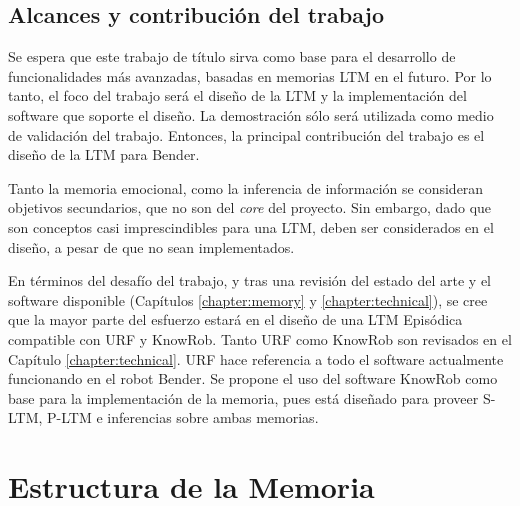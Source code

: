 \subsection{Alcances y contribución del trabajo}
Se espera que este trabajo de título sirva como base para el desarrollo de funcionalidades más avanzadas, basadas en memorias LTM en el futuro. Por lo tanto, el foco del trabajo será el diseño de la LTM y la implementación del software que soporte el diseño. La demostración sólo será utilizada como medio de validación del trabajo. Entonces, la principal contribución del trabajo es el diseño de la LTM para Bender.

Tanto la memoria emocional, como la inferencia de información se consideran objetivos secundarios, que no son del \textit{core} del proyecto. Sin embargo, dado que son conceptos casi imprescindibles para una LTM, deben ser considerados en el diseño, a pesar de que no sean implementados.

En términos del desafío del trabajo, y tras una revisión del estado del arte y el software disponible (Capítulos \ref{chapter:memory} y \ref{chapter:technical}), se cree que la mayor parte del esfuerzo estará en el diseño de una LTM Episódica compatible con URF y KnowRob. Tanto URF como KnowRob  son revisados en el Capítulo \ref{chapter:technical}. URF hace referencia a todo el software actualmente funcionando en el robot Bender. Se propone el uso del software KnowRob como base para la implementación de la memoria, pues está diseñado para proveer S-LTM, P-LTM e inferencias sobre ambas memorias.


\section{Estructura de la Memoria}
